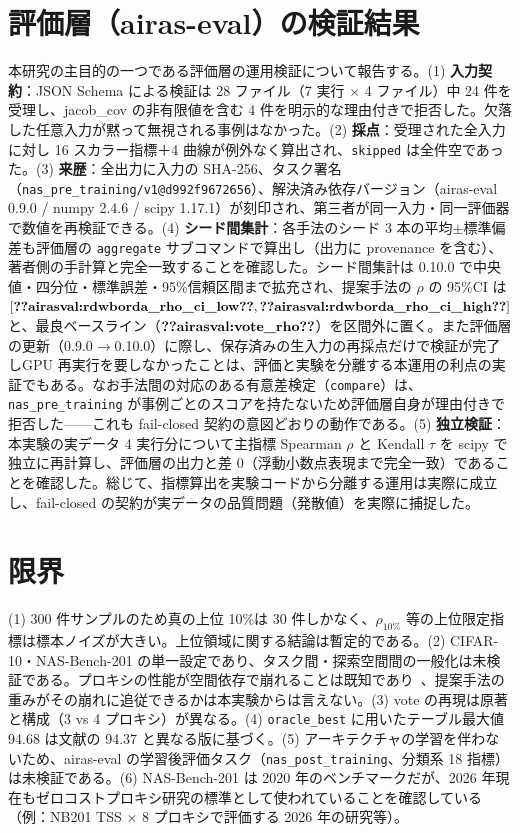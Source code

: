 \documentclass[11pt]{article}
\begin{document}
\section{評価層（airas-eval）の検証結果}
本研究の主目的の一つである評価層の運用検証について報告する。(1) \textbf{入力契約}：JSON Schema による検証は 28 ファイル（7 実行 $\times$ 4 ファイル）中 24 件を受理し、jacob\_cov の非有限値を含む 4 件を明示的な理由付きで拒否した。欠落した任意入力が黙って無視される事例はなかった。(2) \textbf{採点}：受理された全入力に対し 16 スカラー指標＋4 曲線が例外なく算出され、\texttt{skipped} は全件空であった。(3) \textbf{来歴}：全出力に入力の SHA-256、タスク署名（\texttt{nas\_pre\_training/v1@d992f9672656}）、解決済み依存バージョン（airas-eval 0.9.0 / numpy 2.4.6 / scipy 1.17.1）が刻印され、第三者が同一入力・同一評価器で数値を再検証できる。(4) \textbf{シード間集計}：各手法のシード 3 本の平均$\pm$標準偏差も評価層の \texttt{aggregate} サブコマンドで算出し（出力に provenance を含む）、著者側の手計算と完全一致することを確認した。シード間集計は 0.10.0 で中央値・四分位・標準誤差・95\%信頼区間まで拡充され、提案手法の $\rho$ の 95\%CI は $[\airasval{rdwborda_rho_ci_low}, \airasval{rdwborda_rho_ci_high}]$ と、最良ベースライン（$\airasval{vote_rho}$）を区間外に置く。また評価層の更新（0.9.0$\to$0.10.0）に際し、保存済みの生入力の再採点だけで検証が完了しGPU 再実行を要しなかったことは、評価と実験を分離する本運用の利点の実証でもある。なお手法間の対応のある有意差検定（\texttt{compare}）は、\texttt{nas\_pre\_training} が事例ごとのスコアを持たないため評価層自身が理由付きで拒否した——これも fail-closed 契約の意図どおりの動作である。(5) \textbf{独立検証}：本実験の実データ 4 実行分について主指標 Spearman $\rho$ と Kendall $\tau$ を scipy で独立に再計算し、評価層の出力と差 $0$（浮動小数点表現まで完全一致）であることを確認した。総じて、指標算出を実験コードから分離する運用は実際に成立し、fail-closed の契約が実データの品質問題（発散値）を実際に捕捉した。

\section{限界}
(1) 300 件サンプルのため真の上位 10\%は 30 件しかなく、$\rho_{10\%}$ 等の上位限定指標は標本ノイズが大きい。上位領域に関する結論は暫定的である。(2) CIFAR-10・NAS-Bench-201 の単一設定であり、タスク間・探索空間間の一般化は未検証である。プロキシの性能が空間依存で崩れることは既知であり~\cite{krishnakumar-2022-nas}、提案手法の重みがその崩れに追従できるかは本実験からは言えない。(3) vote の再現は原著と構成（3 vs 4 プロキシ）が異なる。(4) \texttt{oracle\_best} に用いたテーブル最大値 94.68 は文献の 94.37 と異なる版に基づく。(5) アーキテクチャの学習を伴わないため、airas-eval の学習後評価タスク（\texttt{nas\_post\_training}、分類系 18 指標）は未検証である。(6) NAS-Bench-201 は 2020 年のベンチマークだが、2026 年現在もゼロコストプロキシ研究の標準として使われていることを確認している（例：NB201 TSS $\times$ 8 プロキシで評価する 2026 年の研究等）。
\end{document}
